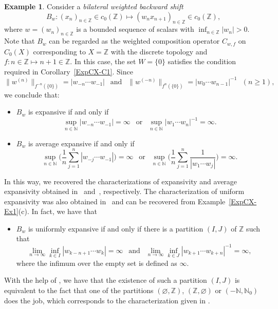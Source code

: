 \documentclass[12pt]{article}
\theoremstyle{plain}
\theoremstyle{definition}
\newtheorem{example}[theorem]{Example}%
\newcommand{\N}{\mathbb{N}} %
\newcommand{\Z}{\mathbb{Z}} %
\begin{document}
\begin{example}\label{ExpCX-Ex5}
Consider a {\em bilateral weighted backward shift}
\[
B_w : (x_n)_{n \in \Z} \in c_0(\Z) \mapsto (w_n x_{n+1})_{n \in \Z} \in c_0(\Z),
\]
where $w = (w_n)_{n \in \Z}$ is a bounded sequence of scalars with $\inf_{n \in \Z} |w_n| > 0$.
Note that $B_w$ can be regarded as the weighted composition operator $C_{w,f}$ on $C_0(X)$ 
corresponding to $X = \Z$ with the discrete topology and $f : n \in \Z \mapsto n+1 \in \Z$.
In this case, the set $W = \{0\}$ satisfies the condition required in Corollary~\ref{ExpCX-C1}.
Since
\[
\|w^{(n)}\|_{f^{-n}(\{0\})} = |w_{-n} \cdots w_{-1}| \ \ \text{ and } \ \ 
\|w^{(-n)}\|_{f^{n}(\{0\})} = |w_0 \cdots w_{n-1}|^{-1} \ \ \ (n \geq 1),
\]
we conclude that:
\begin{itemize}
\item $B_w$ is expansive if and only if
  \[
  \sup_{n \in \N} |w_{-n} \cdots w_{-1}| = \infty \ \ \text{ or } \ \ \sup_{n \in \N}  |w_1 \cdots w_n|^{-1} = \infty.
  \]
\item $B_w$ is average expansive if and only if
  \[
  \sup_{n \in \N} \Big(\frac{1}{n} \sum_{j=1}^n |w_{-j} \cdots w_{-1}|\Big) = \infty \ \ \text{ or } \ \ 
  \sup_{n \in \N} \Big(\frac{1}{n} \sum_{j=1}^n \frac{1}{|w_1 \cdots w_j|}\Big) = \infty.
  \]
\end{itemize}
In this way, we recovered the characterizations of expansivity and average expansivity obtained 
in~\cite{BerCirDarMesPuj18} and~\cite{AlvBerMes21}, respectively.
The characterization of uniform expansivity was also obtained in~\cite{BerCirDarMesPuj18}
and can be recovered from Example~\ref{ExpCX-Ex1}(c). 
In fact, we have that 
\begin{itemize}
\item $B_w$ is uniformly expansive if and only if there is a partition $(I,J)$ of $\Z$ such that
  \[
  \lim_{n \to \infty} \inf_{k \in I} |w_{k-n+1} \cdots w_k| = \infty \ \ \text{ and } \ \
  \lim_{n \to \infty} \inf_{k \in J} |w_{k+1} \cdots w_{k+n}|^{-1} = \infty,
  \]
  where the infimum over the empty set is defined as $\infty$.
\end{itemize}
With the help of \cite[Lemma~31]{BerCirDarMesPuj18}, we have that the existence of such a partition $(I,J)$ is equivalent to
the fact that one of the partitions $(\varnothing,\Z)$, $(\Z,\varnothing)$ or $(-\N,\N_0)$ does the job,
which corresponds to the characterization given in \cite{BerCirDarMesPuj18}.
\end{example}
\end{document}
